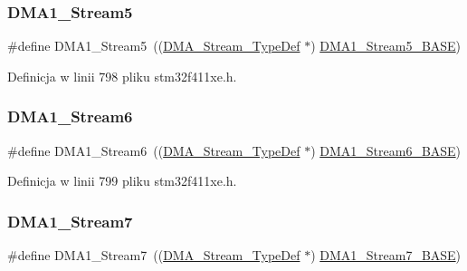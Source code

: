 \subsubsection{\texorpdfstring{D\+M\+A1\+\_\+\+Stream5}{DMA1\_Stream5}}
{\footnotesize\ttfamily \#define D\+M\+A1\+\_\+\+Stream5~((\hyperlink{struct_d_m_a___stream___type_def}{D\+M\+A\+\_\+\+Stream\+\_\+\+Type\+Def} $\ast$) \hyperlink{group___peripheral__memory__map_ga0ded7bed8969fe2e2d616e7f90eb7654}{D\+M\+A1\+\_\+\+Stream5\+\_\+\+B\+A\+SE})}



Definicja w linii 798 pliku stm32f411xe.\+h.

\mbox{\label{group___peripheral__declaration_gac95127480470900755953f1cfe68567d}} 
\subsubsection{\texorpdfstring{D\+M\+A1\+\_\+\+Stream6}{DMA1\_Stream6}}
{\footnotesize\ttfamily \#define D\+M\+A1\+\_\+\+Stream6~((\hyperlink{struct_d_m_a___stream___type_def}{D\+M\+A\+\_\+\+Stream\+\_\+\+Type\+Def} $\ast$) \hyperlink{group___peripheral__memory__map_ga58998ddc40adb6361704d6c9dad08125}{D\+M\+A1\+\_\+\+Stream6\+\_\+\+B\+A\+SE})}



Definicja w linii 799 pliku stm32f411xe.\+h.

\mbox{\label{group___peripheral__declaration_ga8ecdeaf43d0f4207dab1fdb4d7bf8d26}} 
\subsubsection{\texorpdfstring{D\+M\+A1\+\_\+\+Stream7}{DMA1\_Stream7}}
{\footnotesize\ttfamily \#define D\+M\+A1\+\_\+\+Stream7~((\hyperlink{struct_d_m_a___stream___type_def}{D\+M\+A\+\_\+\+Stream\+\_\+\+Type\+Def} $\ast$) \hyperlink{group___peripheral__memory__map_ga82186dd6d3f60995d428b34c041919d7}{D\+M\+A1\+\_\+\+Stream7\+\_\+\+B\+A\+SE})}



